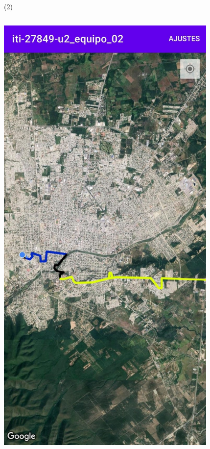 \begin{frame}{ (2)}
\begin{columns}
\begin{column}{0.25\textwidth}
\includegraphics[width=0.82\textwidth]{2022_MapaVickyRanch/figs/F13}
\end{column}

\end{columns} 
\end{frame}


